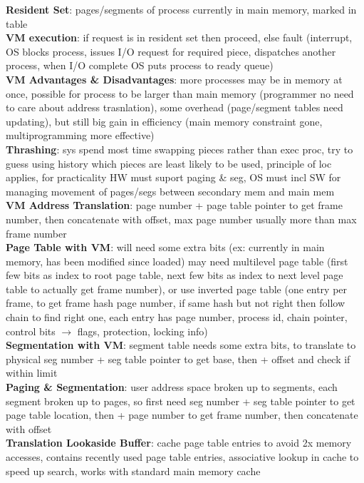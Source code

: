 \documentclass[a4paper]{article}
\begin{document}
\begin{multicols}{2}
        \textbf{Resident Set}: pages/segments of process currently in main memory, marked in table\\
        \textbf{VM execution}: if request is in resident set then proceed, else fault (interrupt, OS blocks process, issues I/O request for required piece, dispatches another process, when I/O complete OS puts process to ready queue)\\
        \textbf{VM Advantages \& Disadvantages}: more processes may be in memory at once, possible for process to be larger than main memory (programmer no need to care about address trasnlation), some overhead (page/segment tables need updating), but still big gain in efficiency (main memory constraint gone, multiprogramming more effective)\\
        \textbf{Thrashing}: sys spend most time swapping pieces rather than exec proc, try to guess using history which pieces are least likely to be used, principle of loc applies, for practicality HW must suport paging \& seg, OS must incl SW for managing movement of pages/segs between secondary mem and main mem\\
        \textbf{VM Address Translation}: page number + page table pointer to get frame number, then concatenate with offset, max page number usually more than max frame number\\
        \textbf{Page Table with VM}: will need some extra bits (ex: currently in main memory, has been modified since loaded) may need multilevel page table (first few bits as index to root page table, next few bits as index to next level page table to actually get frame number), or use inverted page table (one entry per frame, to get frame hash page number, if same hash but not right then follow chain to find right one, each entry has page number, process id, chain pointer, control bits $\to$ flags, protection, locking info)\\
        \textbf{Segmentation with VM}: segment table needs some extra bits, to translate to physical seg number + seg table pointer to get base, then + offset and check if within limit\\
        \textbf{Paging \& Segmentation}: user address space broken up to segments, each segment broken up to pages, so first need seg number + seg table pointer to get page table location, then + page number to get frame number, then concatenate with offset\\
        \textbf{Translation Lookaside Buffer}: cache page table entries to avoid 2x memory accesses, contains recently used page table entries, associative lookup in cache to speed up search, works with standard main memory cache\\

\end{multicols}
\end{document}

